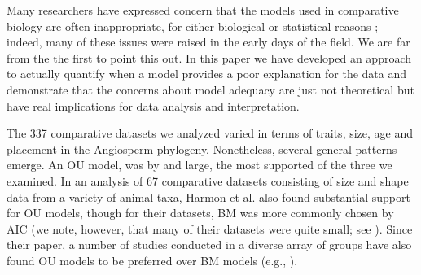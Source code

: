 \documentclass[a4paper,12pt]{article}
\begin{document}
Many researchers have expressed concern that the models used in comparative biology are often inappropriate, for either biological or statistical reasons \citep{Felsenstein1985, Felsenstein1988, HarveyPagel1991, Garland1992, Diaz1996, HansenMartins1996, Price1997, Garland1999, GarlandIves2000, HansenOrzack2005, Hansen2012, Felsenstein2012, Boettiger2012, SlaterPennell}; indeed, many of these issues were raised in the early days of the field.  We are far from the the first to point this out.
%
In this paper we have developed an approach to actually quantify when a model provides a poor explanation for the data and demonstrate that the concerns about model adequacy are just not theoretical but have real implications for data analysis and interpretation.

The 337 comparative datasets we analyzed varied in terms of traits, size, age and placement in the Angiosperm phylogeny. Nonetheless, several general patterns emerge. An OU model, was by and large, the most supported of the three we examined. In an analysis of 67 comparative datasets consisting of size and shape data from a variety of animal taxa, Harmon et al. \citep{Harmon2010} also found substantial support for OU models, though for their datasets, BM was more commonly chosen by AIC (we note, however, that many of their datasets were quite small; see \citep{SlaterPennell}). Since their paper, a number of studies conducted in a diverse array of groups have also found OU models to be preferred over BM models (e.g., \citep{Burbrink2012, Wiens2013, Lopez2013}). 
\end{document}
